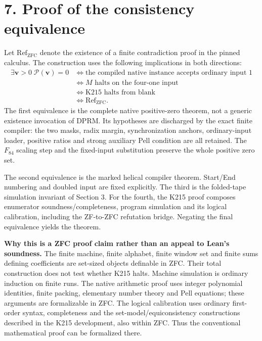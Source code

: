 \documentclass[10pt]{article}
\begin{document}
\section*{7. Proof of the consistency equivalence}
Let $\mathrm{Ref}_{\mathrm{ZFC}}$ denote the existence of a finite contradiction proof in the pinned calculus. The construction uses the following implications in both directions:
\[
\begin{aligned}
\exists\mathbf v>0\;\mathcal P(\mathbf v)=0
&\Longleftrightarrow \text{the compiled native instance accepts ordinary input }1\\
&\Longleftrightarrow M\text{ halts on the four-one input}\\
&\Longleftrightarrow \mathrm{K215}\text{ halts from blank}\\
&\Longleftrightarrow \mathrm{Ref}_{\mathrm{ZFC}}.
\end{aligned}
\]
The first equivalence is the complete native positive-zero theorem, not a generic existence invocation of DPRM. Its hypotheses are discharged by the exact finite compiler: the two masks, radix margin, synchronization anchors, ordinary-input loader, positive ratios and strong auxiliary Pell condition are all retained. The $F_{84}$ scaling step and the fixed-input substitution preserve the whole positive zero set.

The second equivalence is the marked helical compiler theorem. Start/End numbering and doubled input are fixed explicitly. The third is the folded-tape simulation invariant of Section 3. For the fourth, the K215 proof composes enumerator soundness/completeness, program simulation and its logical calibration, including the ZF-to-ZFC refutation bridge. Negating the final equivalence yields the theorem.

\textbf{Why this is a ZFC proof claim rather than an appeal to Lean's soundness.} The finite machine, finite alphabet, finite window set and finite sums defining coefficients are set-sized objects definable in ZFC. Their total construction does not test whether K215 halts. Machine simulation is ordinary induction on finite runs. The native arithmetic proof uses integer polynomial identities, finite packing, elementary number theory and Pell equations; these arguments are formalizable in ZFC. The logical calibration uses ordinary first-order syntax, completeness and the set-model/equiconsistency constructions described in the K215 development, also within ZFC. Thus the conventional mathematical proof can be formalized there.
\end{document}
